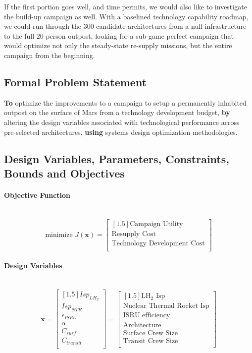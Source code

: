 \documentclass[11pt]{article} %
\newcommand{\myparagraph}[1]{\paragraph{#1}\mbox{}\\}
\begin{document}
If the first portion goes well, and time permits, we would also like to investigate the build-up campaign as well.  With a baselined technology capability roadmap, we could run through the 300 candidate architectures from a null-infrastructure to the full 20 person outpost, looking for a sub-game perfect campaign that would optimize not only the steady-state re-supply missions, but the entire campaign from the beginning.

\subsection{Formal Problem Statement}
\textbf{To} optimize the improvements to a campaign to setup a permanently inhabited outpost on the surface of Mars from a technology development budget, \textbf{by} altering the design variables associated with technological performance across pre-selected architectures, \textbf{using} systems design optimization methodologies. 
\subsection{Design Variables, Parameters, Constraints, Bounds and Objectives}

\myparagraph{Objective Function}
\begin{equation*}
\mbox{minimize }J(\mathbf{x})=
\begin{bmatrix}[1.5]
\mbox{Campaign Utility}\\
\mbox{Resupply Cost}\\
\mbox{Technology Development Cost}\\
\end{bmatrix}
\end{equation*}
\myparagraph{Design Variables}
\begin{equation*}
\mathbf{x}=
\begin{bmatrix}[1.5]
Isp_{LH_2}\\
Isp_{NTR}\\
\epsilon_{ISRU}\\
\alpha\\
C_{surf}\\
C_{transit}\\
\end{bmatrix}
=
\begin{bmatrix}[1.5]
\mbox{LH}_2\mbox{ Isp}\\
\mbox{Nuclear Thermal Rocket Isp}\\
\mbox{ISRU efficiency}\\
\mbox{Architecture}\\
\mbox{Surface Crew Size}\\
\mbox{Transit Crew Size}\\
\end{bmatrix}
\end{equation*}
\end{document}
